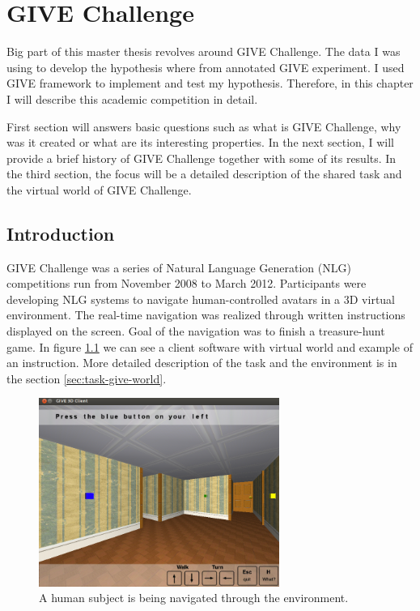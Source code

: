 \chapter{GIVE Challenge}
\label{chap:give-challenge}
Big part of this master thesis revolves around GIVE Challenge. The data I was using to develop the hypothesis where from annotated GIVE experiment. I used GIVE framework to implement and test my hypothesis. Therefore, in this chapter I will describe this academic competition in detail.  

First section will answers basic questions such as what is GIVE Challenge, why was it created or what are its interesting properties. In the next section, I will provide a brief history of GIVE Challenge together with some of its results. In the third section, the focus will be a detailed description of the shared task and the virtual world of GIVE Challenge.

\section{Introduction}
GIVE Challenge was a series of Natural Language Generation (NLG) competitions run from November 2008 to March 2012. Participants were developing NLG systems to navigate human-controlled avatars in a 3D virtual environment. The real-time navigation was realized through written instructions displayed on the screen. Goal of the navigation was to finish a treasure-hunt game. In figure \ref{fig:give-client} we can see a client software with virtual world and example of an instruction. More detailed description of the task and the environment is in the section \ref{sec:task-give-world}.

\begin{figure}[!htbp]
  \centering
	\includegraphics[width=0.7\textwidth]{Images/give-client}
	\caption{A human subject is being navigated through the environment.}
	\label{fig:give-client}
\end{figure}

